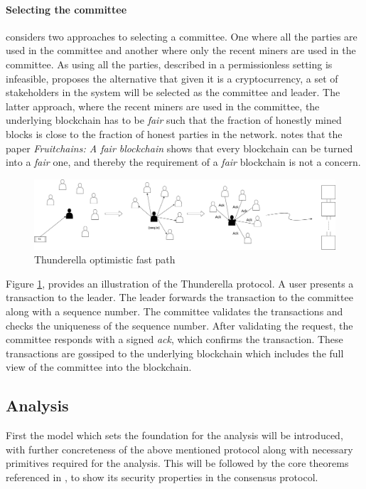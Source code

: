 \paragraph{Selecting the committee} \cite{thunderella} considers two approaches to selecting a committee. One where all the parties are used in the committee and another where only the recent miners are used in the committee. As using all the parties, described in a permissionless setting is infeasible, \cite{thunderella} proposes the alternative that given it is a cryptocurrency, a set of stakeholders in the system will be selected as the committee and leader. The latter approach, where the recent miners are used in the committee, the underlying blockchain has to be \emph{fair} such that the fraction of honestly mined blocks is close to the fraction of honest parties in the network. \cite{thunderella} notes that the paper \emph{Fruitchains: A fair blockchain} shows that every blockchain can be turned into a \emph{fair} one, and thereby the requirement of a \emph{fair} blockchain is not a concern. 

\begin{figure}[H]
    \centering
    \includegraphics[width=\linewidth]{images/thunderella-design.png}
    \caption{Thunderella optimistic fast path}
    \label{fig:thunderella-design}
\end{figure}

Figure \ref{fig:thunderella-design}, provides an illustration of the Thunderella protocol. A user presents a transaction to the leader. The leader forwards the transaction to the committee along with a sequence number. The committee validates the transactions and checks the uniqueness of the sequence number. After validating the request, the committee responds with a signed \emph{ack}, which confirms the transaction. These transactions are gossiped to the underlying blockchain which includes the full view of the committee into the blockchain.

\subsection{Analysis}
First the model which sets the foundation for the analysis will be introduced, with further concreteness of the above mentioned protocol along with necessary primitives required for the analysis. This will be followed by the core theorems referenced in \cite{thunderella}, to show its security properties in the consensus protocol. 

